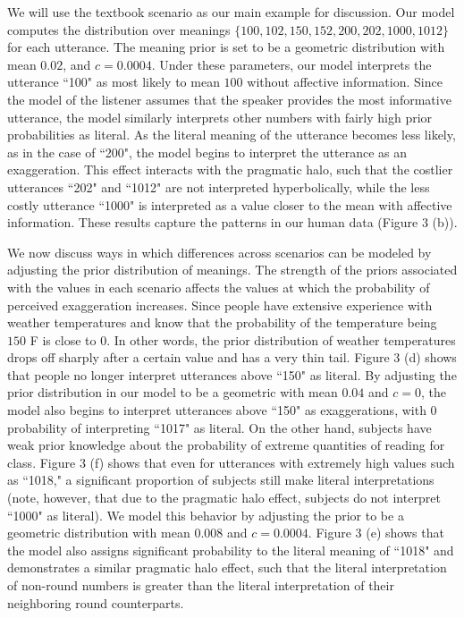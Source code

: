 \documentclass{article} %
\begin{document}
We will use the textbook scenario as our main example for discussion. Our model computes the distribution over meanings $\{100, 102, 150, 152, 200, 202, 1000, 1012\}$ for each utterance. The meaning prior is set to be a geometric distribution with mean $0.02$, and $c = 0.0004$. Under these parameters, our model interprets the utterance ``100" as most likely to mean $100$ without affective information. Since the model of the listener assumes that the speaker provides the most informative utterance, the model similarly interprets other numbers with fairly high prior probabilities as literal. As the literal meaning of the utterance becomes less likely, as in the case of ``200", the model begins to interpret the utterance as an exaggeration. This effect interacts with the pragmatic halo, such that the costlier utterances ``202" and ``1012" are not interpreted hyperbolically, while the less costly utterance ``1000" is interpreted as a value closer to the mean with affective information. These results capture the patterns in our human data (Figure 3 (b)). 

We now discuss ways in which differences across scenarios can be modeled by adjusting the prior distribution of meanings. The strength of the priors associated with the values in each scenario affects the values at which the probability of perceived exaggeration increases. Since people have extensive experience with weather temperatures and know that the probability of the temperature being $150$ F is close to $0$. In other words, the prior distribution of weather temperatures drops off sharply after a certain value and has a very thin tail. Figure 3 (d) shows that people no longer interpret utterances above ``150" as literal. By adjusting the prior distribution in our model to be a geometric with mean $0.04$ and $c=0$, the model also begins to interpret utterances above ``150" as exaggerations, with $0$ probability of interpreting ``1017" as literal.  On the other hand, subjects have weak prior knowledge about the probability of extreme quantities of reading for class. Figure 3 (f) shows that even for utterances with extremely high values such as ``1018," a significant proportion of subjects still make literal interpretations (note, however, that due to the pragmatic halo effect, subjects do not interpret ``1000" as literal). We model this behavior by adjusting the prior to be a geometric distribution with mean $0.008$ and $c=0.0004$. Figure 3 (e) shows that the model also assigns significant probability to the literal meaning of ``1018" and demonstrates a similar pragmatic halo effect, such that the literal interpretation of non-round numbers is greater than the literal interpretation of their neighboring round counterparts.
\end{document}
